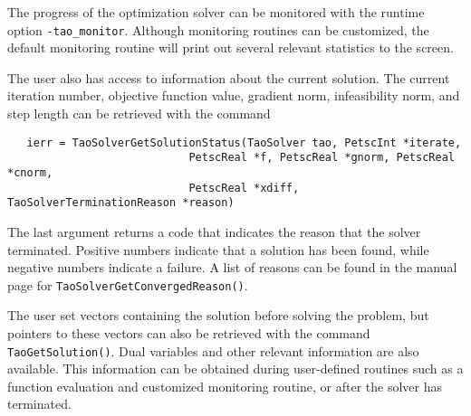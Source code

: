 The progress of the optimization solver can be monitored with
the runtime option {\tt -tao\_monitor}.  Although monitoring routines
can be customized, the default monitoring routine will print out 
several relevant statistics to the screen.

The user also has access to information about the current solution.
The current iteration number, objective function value, gradient
norm, infeasibility norm, and step length 
can be retrieved with the command 
\begin{verbatim}
   ierr = TaoSolverGetSolutionStatus(TaoSolver tao, PetscInt *iterate, 
                            PetscReal *f, PetscReal *gnorm, PetscReal *cnorm,
                            PetscReal *xdiff, TaoSolverTerminationReason *reason)
\end{verbatim}
\noindent
The last argument returns
a code that indicates the reason that the solver terminated.  Positive 
numbers indicate that a solution has been found, while negative numbers
indicate a failure.  A list of reasons can be found in the manual page
for {\tt TaoSolverGetConvergedReason()}.

The user set
vectors containing the solution before solving
the problem, but pointers to these vectors can also be retrieved with the
command {\tt TaoGetSolution()}.
Dual variables and other relevant information are also available. 
This information can be obtained during
user-defined routines such as a function evaluation and customized
monitoring routine, or after the solver has terminated.

